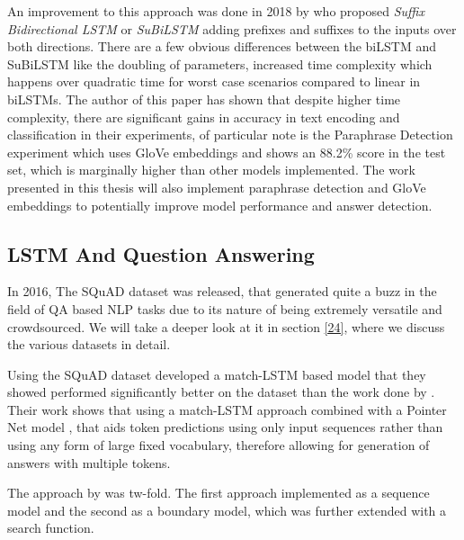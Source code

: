 \documentclass[a4paper,12pt]{report}
\begin{document}
			  An improvement to this approach was done in 2018 by \citep{lstmSubilstm} who proposed \textit{Suffix Bidirectional LSTM} or \textit{SuBiLSTM} adding prefixes and suffixes to the inputs over both directions.  There are a few obvious differences between the biLSTM and SuBiLSTM like the doubling of parameters, increased time complexity which happens over quadratic time for worst case scenarios compared to linear in biLSTMs.
			  The author of this paper has shown that despite higher time complexity, there are significant gains in accuracy in text encoding and classification in their experiments, of particular note is the Paraphrase Detection experiment which uses GloVe embeddings and shows an 88.2\% score in the test set, which is marginally higher than other models implemented.
			  The work presented in this thesis will also implement paraphrase detection and GloVe embeddings to potentially improve model performance and answer detection.

			  \subsection{LSTM And Question Answering}\label{c2lstmqa}
             In 2016, The SQuAD dataset \citep{dataset1} was released, that generated quite a buzz in the field of QA based NLP tasks due to its nature of being extremely versatile and crowdsourced. We will take  a deeper look at it in section \ref{24}, where we discuss the various datasets in detail.

             Using the SQuAD dataset \citep{lstmhu2016question} developed a match-LSTM \citep{lstmMatch} based model that they showed performed significantly better on the dataset than the work done by \citep{dataset1}. Their work shows that using a match-LSTM approach combined with a Pointer Net model \citep{lstmPointer}, that aids token predictions using only input sequences rather than using any form of large fixed vocabulary, therefore allowing for generation of answers with multiple tokens.

             The approach by \citep{lstmhu2016question} was tw-fold. The first approach implemented as a sequence model and the second as a boundary model, which was further extended with a search function.
\end{document}
